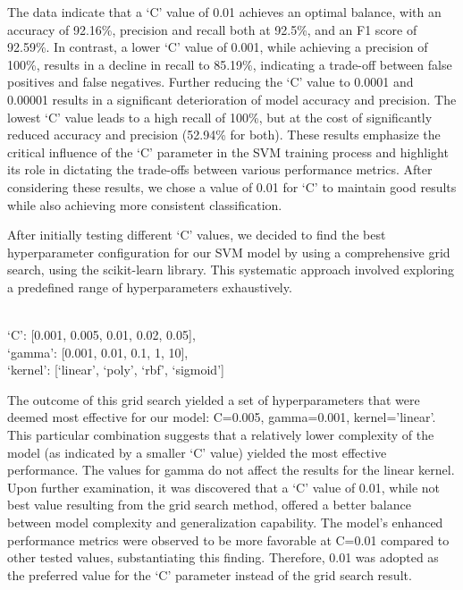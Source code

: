 \documentclass[english,bachelor]{swsLeipzig}
\begin{document}
The data indicate that a `C' value of 0.01 achieves an optimal balance, with an accuracy of 92.16\%, 
precision and recall both at 92.5\%, and an F1 score of 92.59\%. In contrast, a lower `C' value of 0.001, while achieving a precision of 100\%, results in a decline in recall to 85.19\%, indicating a trade-off between false positives and false negatives. Further reducing the `C' value to 0.0001 and 0.00001 results in a significant deterioration of model accuracy and precision. The lowest `C' value leads to a high recall of 100\%, but at the cost of significantly reduced accuracy and precision (52.94\% for both). These results emphasize the critical influence of the `C' parameter in the SVM training process and highlight its role in dictating the trade-offs between various performance metrics. After considering these results, we chose a value of 0.01 for `C' to maintain good results while also achieving more consistent classification.

After initially testing different `C' values, we decided to find the best hyperparameter configuration for our SVM model by using a comprehensive grid 
search, using the scikit-learn library. This systematic approach involved exploring a predefined range of hyperparameters exhaustively.\\\\

\begin{adjustwidth}{1cm}{0cm}
  `C': [0.001, 0.005, 0.01, 0.02, 0.05],\\
  `gamma': [0.001, 0.01, 0.1, 1, 10],\\
  `kernel': [`linear', `poly', `rbf', `sigmoid']\\
\end{adjustwidth}

The outcome of this grid search yielded a set of hyperparameters that were deemed most effective for our 
model: C=0.005, gamma=0.001, kernel='linear'. This particular combination suggests that a relatively lower complexity of the model (as indicated by a smaller `C' value) yielded the most effective performance. The values for gamma do not affect the results for the linear kernel. Upon further examination, it was discovered that a `C' value of 0.01, while not best value resulting from the grid search method, offered a better balance between model complexity and generalization capability. The model's enhanced performance metrics were observed to be more favorable at C=0.01 compared to other tested values, substantiating this finding. Therefore, 0.01 was adopted as the preferred value for the `C' parameter instead of the grid search result.
\end{document}
